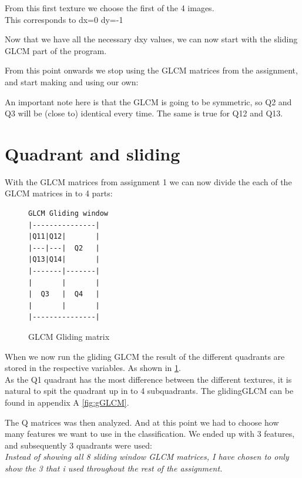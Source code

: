 \documentclass{article}
\begin{document}
	From this first texture we choose the first of the 4 images.\\
	This corresponds to dx=0 dy=-1

\vspace{10px}		
	
	Now that we have all the necessary dxy values, we can now start with the sliding GLCM part of the program. 

\newpage
From this point onwards we stop using the GLCM matrices from the assignment, and start making and using our own:

An important note here is that the GLCM is going to be symmetric, so Q2 and Q3 will be (close to) identical every time. The same is true for Q12 and Q13.


\newpage
\section{Quadrant and sliding}
	With the GLCM matrices from assignment 1 we can now divide the each of the GLCM matrices in to 4 parts: 

	\begin{figure}[h]
	\centering
	\begin{BVerbatim}
GLCM Gliding window
|---------------|
|Q11|Q12|       |
|---|---|  Q2   |
|Q13|Q14|       |
|-------|-------|
|       |       |
|  Q3   |  Q4   |
|       |       |
|---------------|
	\end{BVerbatim}
	\caption{GLCM Gliding matrix}%
	\label{verb:gGLCM}
	\end{figure}


When we now run the gliding GLCM the result of the different quadrants are stored in the respective variables. As shown in \ref{verb:gGLCM}.\\

As the Q1 quadrant has the most difference between the different textures, it is natural to spit the quadrant up in to 4 subquadrants.
The glidingGLCM can be found in appendix A \ref{fig:gGLCM}.



\newpage
The Q matrices was then analyzed. And at this point we had to choose how many features we want to use in the classification. We ended up with 3 features, and subsequently 3 quadrants were used:\\
\textit{Instead of showing all 8 sliding window GLCM matrices, I have chosen to only show the 3 that i used throughout the rest of the assignment.}\\
\end{document}
